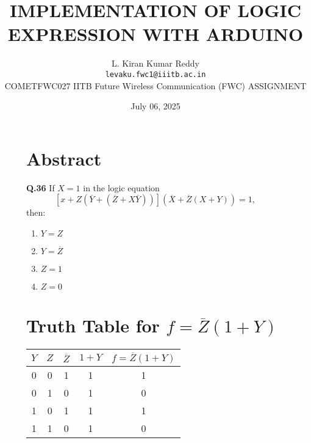 \documentclass[12pt,a4paper]{article}
\title{\textbf{IMPLEMENTATION OF LOGIC EXPRESSION WITH ARDUINO}}
\author{L. Kiran Kumar Reddy \\ \texttt{levaku.fwc1@iiitb.ac.in} \\
 \hspace{-0.3cm}COMETFWC027\hspace{0.5cm} IITB Future Wireless Communication (FWC)\hspace{0.4cm} ASSIGNMENT}
\date{July 06, 2025}
\begin{document}
\maketitle


\begin{figure}[H]
  \centering
  \begin{minipage}[t]{0.48\textwidth}
    \section*{Abstract}
    \small
    \noindent\textbf{Q.36} \quad If $X = 1$ in the logic equation 
    \[
    \left[x + Z \left( \overline{Y} + (\overline{Z} + X\overline{Y}) \right) \right] 
    \left( \overline{X} + \overline{Z}(X + Y) \right) = 1,
    \]
    then:

    \begin{enumerate}[label=(\Alph*)]
        \item $Y = Z$
        \item $Y = \overline{Z}$
        \item $Z = 1$
        \item $Z = 0$
    \end{enumerate}

    \vspace{0.3cm}
    \section*{Truth Table for $f = \overline{Z}(1 + Y)$}
    \renewcommand{\arraystretch}{1.2}
    \begin{tabular}{|c|c|c|c|c|}
    \hline
    $Y$ & $Z$ & $\overline{Z}$ & $1 + Y$ & $f = \overline{Z}(1 + Y)$ \\
    \hline
    0 & 0 & 1 & 1 & 1 \\
    0 & 1 & 0 & 1 & 0 \\
    1 & 0 & 1 & 1 & 1 \\
    1 & 1 & 0 & 1 & 0 \\
    \hline
    \end{tabular}
  \end{minipage}\hfill
  \begin{minipage}[t]{0.48\textwidth}

\end{minipage}
\end{figure}
\end{document}
